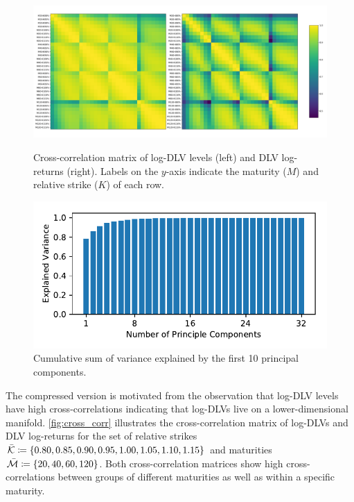 \documentclass[]{article} %
\begin{document}
\begin{figure}[htp]
    \centering
    \begin{minipage}{.45\textwidth}
       \centering
	\includegraphics[width=\textwidth]{figures/imp_vol/plot/real_cross_corrs.pdf}
	\caption{Cross-correlation matrix of log-DLV levels (left) and DLV log-returns (right). Labels on the $y$-axis indicate the maturity ($M$) and relative strike ($K$) of each row.}
	\label{fig:cross_corr}
    \end{minipage}
	\hfill
    \begin{minipage}{0.45\textwidth}
       \centering
	\includegraphics[width=\textwidth]{figures/explained_variance.pdf}
	\caption{Cumulative sum of variance explained by the first 10 principal components.}
	\label{fig:explained_variance}
    \end{minipage}
\end{figure}

The compressed version is motivated from the observation that log-DLV levels have high cross-correlations indicating that log-DLVs live on a lower-dimensional manifold. \autoref{fig:cross_corr} illustrates the cross-correlation matrix of log-DLVs and DLV log-returns for the set of relative strikes ${\bar{\mathcal{K}} \coloneqq \lbrace 0.80, 0.85, 0.90, 0.95, 1.00, 1.05, 1.10, 1.15\rbrace}$ and maturities $\bar{\mathcal{M}} \coloneqq \lbrace 20, 40, 60, 120 \rbrace$. Both cross-correlation matrices show high cross-correlations between groups of different maturities as well as within a specific maturity. 
\end{document}
